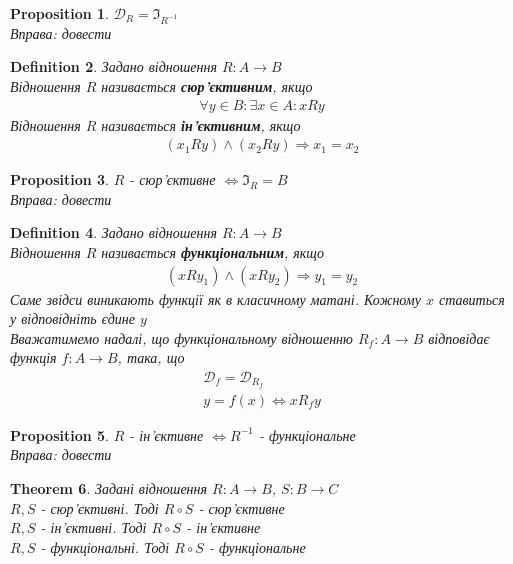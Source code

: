 \documentclass[a4paper, 14pt]{extarticle}
\theoremstyle{theoremdd}
\newtheorem{theorem}{Theorem}[subsection]
\theoremstyle{theoremdd}
\newtheorem{definition}[theorem]{Definition}
\theoremstyle{theoremdd}
\theoremstyle{theoremdd}
\theoremstyle{theoremdd}
\newtheorem{proposition}[theorem]{Proposition}
\theoremstyle{theoremdd}
\theoremstyle{theoremdd}
\theoremstyle{theoremdd}
\begin{document}
\begin{proposition}
$\mathcal{D}_R = \Im_{R^{-1}}$\\
\textit{Вправа: довести}
\end{proposition}

\begin{definition}
Задано відношення $R: A \to B$\\
Відношення $R$ називається \textbf{сюр'єктивним}, якщо
\begin{align*}
\forall y \in B: \exists x \in A: xRy
\end{align*}
Відношення $R$ називається \textbf{ін'єктивним}, якщо
\begin{align*}
(x_1Ry) \wedge (x_2Ry) \Rightarrow x_1 = x_2
\end{align*}
\end{definition}

\begin{proposition}
$R$ - сюр'єктивне $\iff \Im_R = B$\\
\textit{Вправа: довести}
\end{proposition}

\begin{definition}
Задано відношення $R: A \to B$\\
Відношення $R$ називається \textbf{функціональним}, якщо
\begin{align*}
(xRy_1) \wedge (xRy_2) \Rightarrow y_1 = y_2
\end{align*}
Саме звідси виникають функції як в класичному матані. Кожному $x$ ставиться у відповідніть єдине $y$\\
Вважатимемо надалі, що функціональному відношенню $R_f: A \to B$ відповідає функція $f: A \to B$, така, що
\begin{align*}
\mathcal{D}_f = \mathcal{D}_{R_f} \\
y = f(x) \iff xR_fy
\end{align*}
\end{definition}


\begin{proposition}
$R$ - ін'єктивне $\iff R^{-1}$ - функціональне\\
\textit{Вправа: довести}
\end{proposition}

\begin{theorem}
Задані відношення $R: A \to B$, $S: B \to C$\\
$R,S$ - сюр'єктивні. Тоді $R \circ S$ - сюр'єктивне\\
$R,S$ - ін'єктивні. Тоді $R \circ S$ - ін'єктивне\\
$R,S$ - функціональні. Тоді $R \circ S$ - функціональне
\end{theorem}
\end{document}
